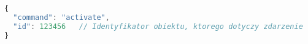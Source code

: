 \begin{lstlisting}[language=JavaScript,numbers=none]
{
  "command": "activate",
  "id": 123456   // Identyfikator obiektu, ktorego dotyczy zdarzenie
}
\end{lstlisting} 